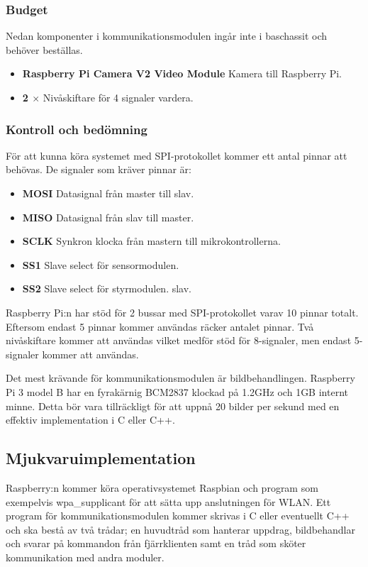 \documentclass[designspec/spec.tex]{subfiles}
\begin{document}
\subsubsection{Budget}
    Nedan komponenter i kommunikationsmodulen ingår inte i baschassit och
    behöver beställas.
\begin{itemize}
    \item \textbf{Raspberry Pi Camera V2 Video Module} Kamera till Raspberry
    Pi.
    \item \textbf{2 $\times$ \modShifter} Nivåskiftare för 4 signaler
    vardera.
\end{itemize}

\subsubsection{Kontroll och bedömning}
För att kunna köra systemet med SPI-protokollet kommer ett antal pinnar att
behövas. De signaler som kräver pinnar är:
\begin{itemize}
    \item \textbf{MOSI} Datasignal från master till slav.
    \item \textbf{MISO} Datasignal från slav till master.
    \item \textbf{SCLK} Synkron klocka från mastern till mikrokontrollerna.
    \item \textbf{SS1} Slave select för sensormodulen.
    \item \textbf{SS2} Slave select för styrmodulen.
    slav.
\end{itemize}
Raspberry Pi:n har stöd för 2 bussar med SPI-protokollet varav 10 pinnar
totalt. Eftersom endast 5 pinnar kommer användas räcker antalet pinnar. Två
nivåskiftare kommer att användas vilket medför stöd för 8-signaler, men endast
5-signaler kommer att användas.

Det mest krävande för kommunikationsmodulen är bildbehandlingen. Raspberry Pi
3 model B har en fyrakärnig BCM2837 klockad på 1.2GHz och 1GB internt minne.
Detta bör vara tillräckligt för att uppnå 20 bilder per sekund med en effektiv
implementation i C eller C++.

\subsection{Mjukvaruimplementation}
Raspberry:n kommer köra operativsystemet Raspbian och program som exempelvis
wpa\_supplicant för att sätta upp anslutningen för WLAN. Ett program för
kommunikationsmodulen kommer skrivas i C eller eventuellt C++ och ska bestå av
två trådar; en huvudtråd som hanterar uppdrag, bildbehandlar och svarar på
kommandon från fjärrklienten samt en tråd som sköter kommunikation med andra
moduler.
\end{document}
